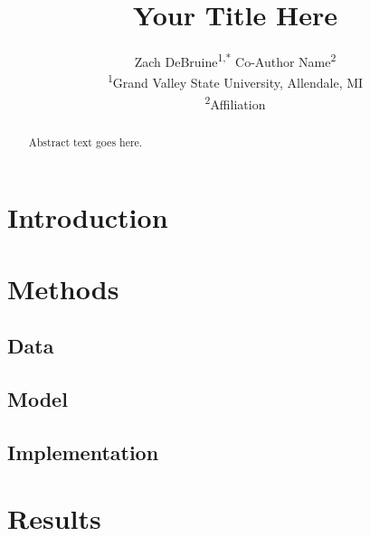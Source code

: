 \documentclass[10pt,twocolumn,letterpaper]{article}
\title{Your Title Here}
\author{
  Zach DeBruine\textsuperscript{1,*}
  \And
  Co-Author Name\textsuperscript{2}
  \\[6pt]
  \textsuperscript{1}Grand Valley State University, Allendale, MI \\
  \textsuperscript{2}Affiliation
}
\begin{document}
\maketitle
{}

\begin{abstract}
  Abstract text goes here.
\end{abstract}


\section{Introduction}

\section{Methods}

\subsection{Data}

\subsection{Model}

\subsection{Implementation}

\section{Results}

\end{document}
